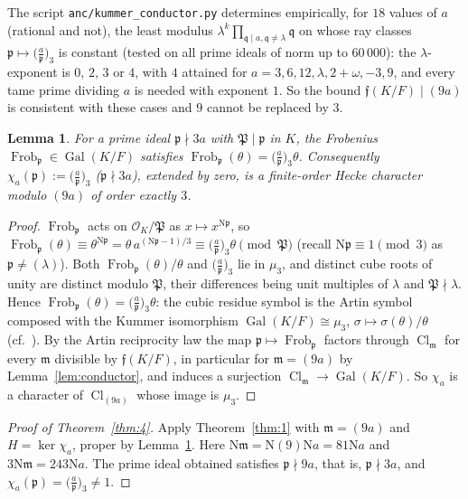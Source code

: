 \documentclass[11pt]{article}
\newtheorem{lemma}{Lemma}[section]
\theoremstyle{definition}
\theoremstyle{remark}
\numberwithin{equation}{section}
\newcommand{\cO}{\mathcal O}
\newcommand{\fp}{\mathfrak p}
\newcommand{\fP}{\mathfrak P}
\newcommand{\fm}{\mathfrak m}
\newcommand{\ff}{\mathfrak f}
\newcommand{\fq}{\mathfrak q}
\newcommand{\Nm}{\mathrm N}
\newcommand{\Cl}{\operatorname{Cl}}
\newcommand{\Frob}{\operatorname{Frob}}
\newcommand{\Gal}{\operatorname{Gal}}
\newcommand{\cubic}[2]{\bigl(\tfrac{#1}{#2}\bigr)_{3}}
\begin{document}
The script \texttt{anc/kummer\_conductor.py} determines empirically, for $18$ values of $a$ (rational and not), the least modulus $\lambda^k\prod_{\fq\mid a,\fq\ne\lambda}\fq$ on whose ray classes $\fp\mapsto\cubic{a}{\fp}$ is constant (tested on all prime ideals of norm up to $60\,000$): the $\lambda$-exponent is $0$, $2$, $3$ or $4$, with $4$ attained for $a=3,6,12,\lambda,2+\omega,-3,9$, and every tame prime dividing $a$ is needed with exponent $1$. So the bound $\ff(K/F)\mid(9a)$ is consistent with these cases and $9$ cannot be replaced by $3$.

\begin{lemma}\label{lem:artin}
For a prime ideal $\fp\nmid3a$ with $\fP\mid\fp$ in $K$, the Frobenius $\Frob_\fp\in\Gal(K/F)$ satisfies $\Frob_\fp(\theta)=\cubic{a}{\fp}\theta$. Consequently $\chi_a(\fp):=\cubic{a}{\fp}$ ($\fp\nmid3a$), extended by zero, is a finite-order Hecke character modulo $(9a)$ of order exactly $3$.
\end{lemma}

\begin{proof}
$\Frob_\fp$ acts on $\cO_K/\fP$ as $x\mapsto x^{\Nm\fp}$, so $\Frob_\fp(\theta)\equiv\theta^{\Nm\fp}=\theta\,a^{(\Nm\fp-1)/3}\equiv\cubic{a}{\fp}\theta\pmod\fP$ (recall $\Nm\fp\equiv1\pmod3$ as $\fp\ne(\lambda)$). Both $\Frob_\fp(\theta)/\theta$ and $\cubic{a}{\fp}$ lie in $\mu_3$, and distinct cube roots of unity are distinct modulo $\fP$, their differences being unit multiples of $\lambda$ and $\fP\nmid\lambda$. Hence $\Frob_\fp(\theta)=\cubic{a}{\fp}\theta$: the cubic residue symbol is the Artin symbol composed with the Kummer isomorphism $\Gal(K/F)\cong\mu_3$, $\sigma\mapsto\sigma(\theta)/\theta$ (cf.\ \cite[Chapter~4]{lemmermeyer2000}). By the Artin reciprocity law \cite[Chapter~VI, \S7]{neukirch1999} the map $\fp\mapsto\Frob_\fp$ factors through $\Cl_\fm$ for every $\fm$ divisible by $\ff(K/F)$, in particular for $\fm=(9a)$ by Lemma~\ref{lem:conductor}, and induces a surjection $\Cl_\fm\to\Gal(K/F)$. So $\chi_a$ is a character of $\Cl_{(9a)}$ whose image is $\mu_3$.
\end{proof}

\begin{proof}[Proof of Theorem~\ref{thm:4}]
Apply Theorem~\ref{thm:1} with $\fm=(9a)$ and $H=\ker\chi_a$, proper by Lemma~\ref{lem:artin}. Here $\Nm\fm=\Nm(9)\Nm a=81\Nm a$ and $3\Nm\fm=243\Nm a$. The prime ideal obtained satisfies $\fp\nmid9a$, that is, $\fp\nmid3a$, and $\chi_a(\fp)=\cubic{a}{\fp}\ne1$.
\end{proof}
\end{document}
